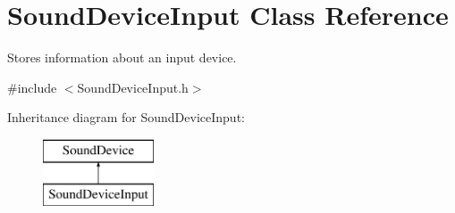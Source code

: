\hypertarget{class_sound_device_input}{
\section{SoundDeviceInput Class Reference}
\label{class_sound_device_input}
}


Stores information about an input device.  




{\ttfamily \#include $<$SoundDeviceInput.h$>$}

Inheritance diagram for SoundDeviceInput:\begin{figure}[H]
\begin{center}
\leavevmode
\includegraphics[height=2.000000cm]{class_sound_device_input}
\end{center}
\end{figure}
